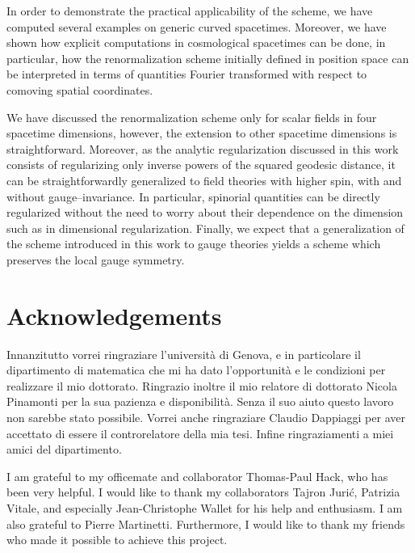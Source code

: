 \documentclass[11pt]{book}
\theoremstyle{break}
\begin{document}
In order to demonstrate the practical applicability of the scheme, we have computed several examples on generic curved spacetimes. Moreover, we have shown how explicit computations in cosmological spacetimes can be done, in particular, how the renormalization scheme initially defined in position space can be interpreted in terms of quantities Fourier transformed with respect to comoving spatial coordinates.

We have discussed the renormalization scheme only for scalar fields in four spacetime dimensions, however, the extension to other spacetime dimensions is straightforward. Moreover, as the analytic regularization discussed in this work consists of regularizing only inverse powers of the squared geodesic distance, it can be straightforwardly generalized to field theories with higher spin, with and without gauge--invariance. In particular, spinorial quantities can be directly regularized without the need to worry about their dependence on the dimension such as in dimensional regularization. Finally, we expect that a generalization of the scheme introduced in this work to gauge theories yields a scheme which preserves the local gauge symmetry.


\newpage
\vspace*{100pt}
\thispagestyle{empty}
\chapter*{Acknowledgements}


Innanzitutto vorrei ringraziare l'università di Genova, e in particolare il dipartimento di matematica che mi ha dato l'opportunità e le condizioni per realizzare il mio dottorato. Ringrazio inoltre il mio relatore di dottorato Nicola Pinamonti per la sua pazienza e disponibilità. Senza il suo aiuto questo lavoro non sarebbe stato possibile. Vorrei anche ringraziare Claudio Dappiaggi per aver accettato di essere il controrelatore della mia tesi. Infine ringraziamenti a miei amici del dipartimento.


\bigskip


I am grateful to my officemate and collaborator Thomas-Paul Hack, who has been very helpful. I would like to thank my collaborators Tajron Jurić, Patrizia Vitale, and especially Jean-Christophe Wallet for his help and enthusiasm. I am also grateful to Pierre Martinetti. Furthermore, I would like to thank my friends who made it possible to achieve this project.
\end{document}
